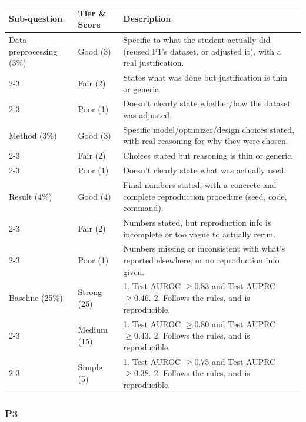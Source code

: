 \documentclass{article}
\begin{document}
\begin{center}
\footnotesize
\begin{tabular}{|p{3cm}|p{1.8cm}|p{9.3cm}|}
\hline
Sub-question & Tier \& Score & Description \\
\hline\hline
Data preprocessing (3\%) & Good (3) & Specific to what the student actually did (reused P1's dataset, or adjusted it), with a real justification. \\
\cline{2-3}
 & Fair (2) & States what was done but justification is thin or generic. \\
\cline{2-3}
 & Poor (1) & Doesn't clearly state whether/how the dataset was adjusted. \\
\hline\hline
Method (3\%) & Good (3) & Specific model/optimizer/design choices stated, with real reasoning for why they were chosen. \\
\cline{2-3}
 & Fair (2) & Choices stated but reasoning is thin or generic. \\
\cline{2-3}
 & Poor (1) & Doesn't clearly state what was actually used. \\
\hline\hline
Result (4\%) & Good (4) & Final numbers stated, with a concrete and complete reproduction procedure (seed, code, command). \\
\cline{2-3}
 & Fair (2) & Numbers stated, but reproduction info is incomplete or too vague to actually rerun. \\
\cline{2-3}
 & Poor (1) & Numbers missing or inconsistent with what's reported elsewhere, or no reproduction info given. \\
\hline\hline
Baseline (25\%) & Strong (25) & 1. Test AUROC $\ge 0.83$ and Test AUPRC $\ge 0.46$. 2. Follows the rules, and is reproducible. \\
\cline{2-3}
 & Medium (15) & 1. Test AUROC $\ge 0.80$ and Test AUPRC $\ge 0.43$. 2. Follows the rules, and is reproducible. \\
\cline{2-3}
 & Simple (5) & 1. Test AUROC $\ge 0.75$ and Test AUPRC $\ge 0.38$. 2. Follows the rules, and is reproducible. \\
\hline\hline
\end{tabular}
\end{center}

\subsubsection*{P3}
\end{document}
